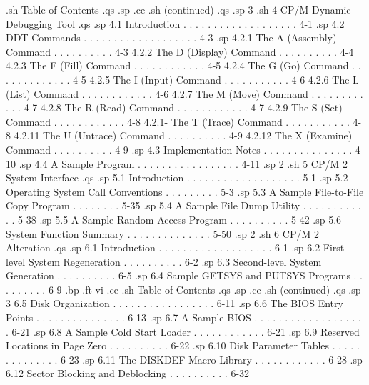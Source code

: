 .sh
Table of Contents
.qs
.sp
.ce
.sh
(continued)
.qs
.sp 3
.sh
4  CP/M Dynamic Debugging Tool
.qs
.sp
   4.1  Introduction  . . . . . . . . . . . . . . . . . . .   4-1
.sp
   4.2  DDT Commands  . . . . . . . . . . . . . . . . . . .   4-3
.sp
        4.2.1  The A (Assembly) Command . . . . . . . . . .   4-3
        4.2.2  The D (Display) Command  . . . . . . . . . .   4-4
        4.2.3  The F (Fill) Command . . . . . . . . . . . .   4-5
        4.2.4  The G (Go) Command . . . . . . . . . . . . .   4-5
        4.2.5  The I (Input) Command  . . . . . . . . . . .   4-6
        4.2.6  The L (List) Command . . . . . . . . . . . .   4-6
        4.2.7  The M (Move) Command . . . . . . . . . . . .   4-7
        4.2.8  The R (Read) Command . . . . . . . . . . . .   4-7
        4.2.9  The S (Set) Command  . . . . . . . . . . . .   4-8
        4.2.1- The T (Trace) Command  . . . . . . . . . . .   4-8
        4.2.11 The U (Untrace) Command  . . . . . . . . . .   4-9
        4.2.12 The X (Examine) Command  . . . . . . . . . .   4-9
.sp
   4.3  Implementation Notes  . . . . . . . . . . . . . . .  4-10
.sp
   4.4  A Sample Program  . . . . . . . . . . . . . . . . .  4-11
.sp 2
.sh
5  CP/M 2 System Interface
.qs
.sp
   5.1  Introduction  . . . . . . . . . . . . . . . . . . .   5-1
.sp
   5.2  Operating System Call Conventions . . . . . . . . .   5-3
.sp
   5.3  A Sample File-to-File Copy Program  . . . . . . . .  5-35
.sp
   5.4  A Sample File Dump Utility  . . . . . . . . . . . .  5-38
.sp
   5.5  A Sample Random Access Program  . . . . . . . . . .  5-42
.sp
   5.6  System Function Summary . . . . . . . . . . . . . .  5-50
.sp 2
.sh
6  CP/M 2 Alteration
.qs
.sp
   6.1  Introduction  . . . . . . . . . . . . . . . . . . .   6-1
.sp
   6.2  First-level System Regeneration . . . . . . . . . .   6-2
.sp
   6.3  Second-level System Generation  . . . . . . . . . .   6-5
.sp
   6.4  Sample GETSYS and PUTSYS Programs . . . . . . . . .   6-9
.bp
.ft                                vi
.ce
.sh
Table of Contents
.qs
.sp
.ce
.sh
(continued)
.qs
.sp 3
   6.5  Disk Organization . . . . . . . . . . . . . . . . .  6-11
.sp
   6.6  The BIOS Entry Points . . . . . . . . . . . . . . .  6-13
.sp
   6.7  A Sample BIOS . . . . . . . . . . . . . . . . . . .  6-21
.sp
   6.8  A Sample Cold Start Loader  . . . . . . . . . . . .  6-21
.sp
   6.9  Reserved Locations in Page Zero . . . . . . . . . .  6-22
.sp
   6.10  Disk Parameter Tables  . . . . . . . . . . . . . .  6-23
.sp
   6.11  The DISKDEF Macro Library  . . . . . . . . . . . .  6-28
.sp
   6.12  Sector Blocking and Deblocking . . . . . . . . . .  6-32
